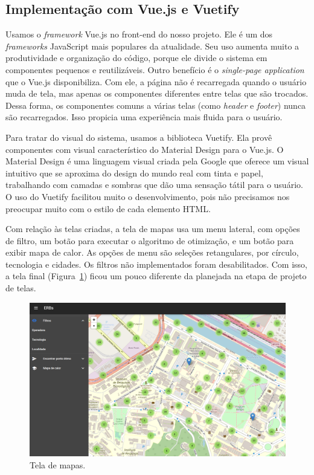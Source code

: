 \documentclass[]{politex}
\begin{document}
\subsection{Implementação com Vue.js e Vuetify}

Usamos o \textit{framework} Vue.js no front-end do nosso projeto. Ele é um dos
\textit{frameworks} JavaScript mais populares da atualidade. Seu uso aumenta
muito a produtividade e organização do código, porque ele divide o sistema em
componentes pequenos e reutilizáveis. Outro benefício é o \textit{single-page
application} que o Vue.js disponibiliza. Com ele, a página não é recarregada
quando o usuário muda de tela, mas apenas os componentes diferentes entre telas
que são trocados. Dessa forma, os componentes comuns a várias telas (como
\textit{header} e \textit{footer}) nunca são recarregados. Isso propicia uma
experiência mais fluida para o usuário.

Para tratar do visual do sistema, usamos a biblioteca Vuetify. Ela provê
componentes com visual característico do Material Design para o Vue.js. O
Material Design é uma linguagem visual criada pela Google que oferece um visual
intuitivo que se aproxima do design do mundo real com tinta e papel, trabalhando
com camadas e sombras que dão uma sensação tátil para o usuário. O uso do
Vuetify facilitou muito o desenvolvimento, pois não precisamos nos preocupar
muito com o estilo de cada elemento HTML.

Com relação às telas criadas, a tela de mapas usa um menu lateral, com opções de
filtro, um botão para executar o algoritmo de otimização, e um botão para exibir
mapa de calor. As opções de menu são seleções retangulares, por círculo,
tecnologia e cidades. Os filtros não implementados foram desabilitados. Com
isso, a tela final (Figura~\ref{fig:tela_mapas}) ficou um pouco diferente da
planejada na etapa de projeto de telas.

\begin{figure}[H]
    \centering
    \includegraphics[width=6in]{imagens/tela-mapas}
    \caption{Tela de mapas.}
    \label{fig:tela_mapas}
\end{figure}
\end{document}
